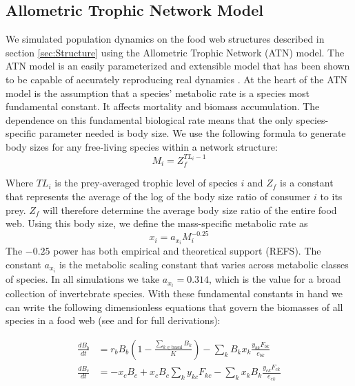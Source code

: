 \documentclass[11pt]{amsart}
\begin{document}
\subsection{Allometric Trophic Network Model}

We simulated population dynamics on the food web structures described in section \ref{sec:Structure} using the Allometric Trophic Network (ATN) model.  The ATN model is an easily parameterized and extensible model that has been shown to be capable of accurately reproducing real dynamics \cite{Boit2012}.  At the heart of the ATN model is the assumption that a species' metabolic rate is a species most fundamental constant.  It affects mortality and biomass accumulation.  The dependence on this fundamental biological rate means that the only species-specific parameter needed is body size.  We use the following formula to generate body sizes for any free-living species within a network structure:
\begin{equation}
M_i= Z_f^{TL_i-1}\label{eq:MFree}
\end{equation}

Where $TL_i$ is the prey-averaged trophic level of species $i$ and $Z_f$ is a constant that represents the average of the log of the body size ratio of consumer $i$ to its prey.  $Z_f$ will therefore determine the average body size ratio of the entire food web.  Using this body size, we define the mass-specific metabolic rate as
\begin{equation}
x_i = a_x_i M_i^{-0.25}\label{eq:x}
\end{equation}
The $-0.25$ power has both empirical and theoretical support (REFS).  The constant $a_x_i$ is the metabolic scaling constant that varies across metabolic classes of species.  In all simulations we take $a_x_i=0.314$, which is the value for a broad collection of invertebrate species.  With these fundamental constants in hand we can write the following dimensionless equations that govern the biomasses of all species in a food web (see \cite{Yodzis1992} and \cite{Willams2007} for full derivations): 

\begin{align}
\frac{dB_{b}}{dt} &= r_bB_b\left(1-\frac{\sum_{k\in\text{basal}}B_k}{K}\right) - \sum_kB_kx_k\frac{y_{bk}F_{bk}}{e_{bk}}\label{eq:basal0} \\ 
\frac{dB_{c}}{dt} &= -x_cB_c + x_cB_c\sum_ky_{kc}F_{kc} - \sum_k x_kB_k\frac{y_{ck}F_{ck}}{e_{ck}} \label{eq:con0}
\end{align}
\end{document}
